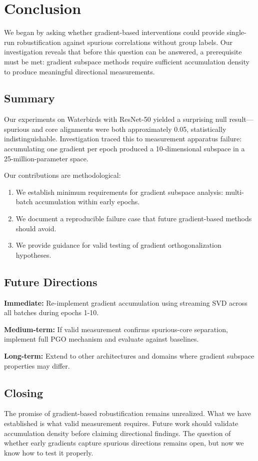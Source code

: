 \section{Conclusion}

We began by asking whether gradient-based interventions could provide single-run robustification against spurious correlations without group labels. Our investigation reveals that before this question can be answered, a prerequisite must be met: gradient subspace methods require sufficient accumulation density to produce meaningful directional measurements.

\subsection{Summary}

Our experiments on Waterbirds with ResNet-50 yielded a surprising null result---spurious and core alignments were both approximately 0.05, statistically indistinguishable. Investigation traced this to measurement apparatus failure: accumulating one gradient per epoch produced a 10-dimensional subspace in a 25-million-parameter space.

Our contributions are methodological:

\begin{enumerate}
    \item We establish minimum requirements for gradient subspace analysis: multi-batch accumulation within early epochs.
    \item We document a reproducible failure case that future gradient-based methods should avoid.
    \item We provide guidance for valid testing of gradient orthogonalization hypotheses.
\end{enumerate}

\subsection{Future Directions}

\textbf{Immediate:} Re-implement gradient accumulation using streaming SVD across all batches during epochs 1-10.

\textbf{Medium-term:} If valid measurement confirms spurious-core separation, implement full PGO mechanism and evaluate against baselines.

\textbf{Long-term:} Extend to other architectures and domains where gradient subspace properties may differ.

\subsection{Closing}

The promise of gradient-based robustification remains unrealized. What we have established is what valid measurement requires. Future work should validate accumulation density before claiming directional findings. The question of whether early gradients capture spurious directions remains open, but now we know how to test it properly.
